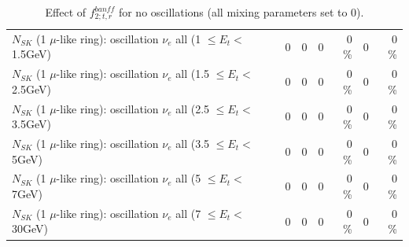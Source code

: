 \begin{table}
\begin{tabular}{| l | r | r | r  r | r  r |}
$N_{SK}$ (1 $\mu$-like ring): oscillation $\nu_{e}$ all (1 $\leq E_{t} <$ 1.5GeV) &               0 &               0 &               0 &        0 \%  &               0 &        0 \%  \\ 
$N_{SK}$ (1 $\mu$-like ring): oscillation $\nu_{e}$ all (1.5 $\leq E_{t} <$ 2.5GeV) &               0 &               0 &               0 &        0 \%  &               0 &        0 \%  \\ 
$N_{SK}$ (1 $\mu$-like ring): oscillation $\nu_{e}$ all (2.5 $\leq E_{t} <$ 3.5GeV) &               0 &               0 &               0 &        0 \%  &               0 &        0 \%  \\ 
$N_{SK}$ (1 $\mu$-like ring): oscillation $\nu_{e}$ all (3.5 $\leq E_{t} <$ 5GeV) &               0 &               0 &               0 &        0 \%  &               0 &        0 \%  \\ 
 $N_{SK}$ (1 $\mu$-like ring): oscillation $\nu_{e}$ all (5 $\leq E_{t} <$ 7GeV) &               0 &               0 &               0 &        0 \%  &               0 &        0 \%  \\ 
$N_{SK}$ (1 $\mu$-like ring): oscillation $\nu_{e}$ all (7 $\leq E_{t} <$ 30GeV) &               0 &               0 &               0 &        0 \%  &               0 &        0 \%  \\ 
\hline
\hline
\end{tabular}
\caption{ Effect of $f_{2; t, r}^{banff}$ for no oscillations (all mixing parameters set to 0). }
\label{tab:num_banff_02_1RmuT_3f_osc_t13:0}
\end{table}
\clearpage
